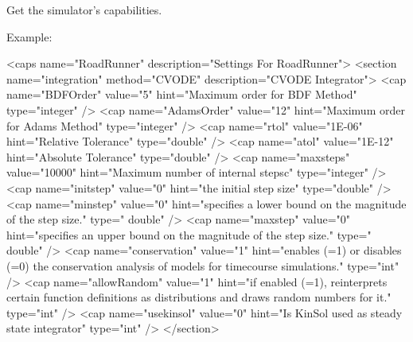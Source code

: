 Get the simulator's capabilities. 

Example\-:


\begin{DoxyCode}
 <caps name=\textcolor{stringliteral}{"RoadRunner"} description=\textcolor{stringliteral}{"Settings For RoadRunner"}>
  <section name=\textcolor{stringliteral}{"integration"} method=\textcolor{stringliteral}{"CVODE"} description=\textcolor{stringliteral}{"CVODE Integrator"}>
    <cap name=\textcolor{stringliteral}{"BDFOrder"} value=\textcolor{stringliteral}{"5"} hint=\textcolor{stringliteral}{"Maximum order for BDF Method"} type=\textcolor{stringliteral}{"integer"} />
    <cap name=\textcolor{stringliteral}{"AdamsOrder"} value=\textcolor{stringliteral}{"12"} hint=\textcolor{stringliteral}{"Maximum order for Adams Method"} type=\textcolor{stringliteral}{"integer"} />
    <cap name=\textcolor{stringliteral}{"rtol"} value=\textcolor{stringliteral}{"1E-06"} hint=\textcolor{stringliteral}{"Relative Tolerance"} type=\textcolor{stringliteral}{"double"} />
    <cap name=\textcolor{stringliteral}{"atol"} value=\textcolor{stringliteral}{"1E-12"} hint=\textcolor{stringliteral}{"Absolute Tolerance"} type=\textcolor{stringliteral}{"double"} />
    <cap name=\textcolor{stringliteral}{"maxsteps"} value=\textcolor{stringliteral}{"10000"} hint=\textcolor{stringliteral}{"Maximum number of internal stepsc"} type=\textcolor{stringliteral}{"integer"} />
    <cap name=\textcolor{stringliteral}{"initstep"} value=\textcolor{stringliteral}{"0"} hint=\textcolor{stringliteral}{"the initial step size"} type=\textcolor{stringliteral}{"double"} />
    <cap name=\textcolor{stringliteral}{"minstep"} value=\textcolor{stringliteral}{"0"} hint=\textcolor{stringliteral}{"specifies a lower bound on the magnitude of the step size."} type=\textcolor{stringliteral}{"
      double"} />
    <cap name=\textcolor{stringliteral}{"maxstep"} value=\textcolor{stringliteral}{"0"} hint=\textcolor{stringliteral}{"specifies an upper bound on the magnitude of the step size."} type=\textcolor{stringliteral}{"
      double"} />
    <cap name=\textcolor{stringliteral}{"conservation"} value=\textcolor{stringliteral}{"1"} hint=\textcolor{stringliteral}{"enables (=1) or disables (=0) the conservation analysis of
       models for timecourse simulations."} type=\textcolor{stringliteral}{"int"} />
    <cap name=\textcolor{stringliteral}{"allowRandom"} value=\textcolor{stringliteral}{"1"} hint=\textcolor{stringliteral}{"if enabled (=1), reinterprets certain function definitions as
       distributions and draws random numbers for it."} type=\textcolor{stringliteral}{"int"} />
    <cap name=\textcolor{stringliteral}{"usekinsol"} value=\textcolor{stringliteral}{"0"} hint=\textcolor{stringliteral}{"Is KinSol used as steady state integrator"} type=\textcolor{stringliteral}{"int"} />
  </section>


\end{DoxyCode}
